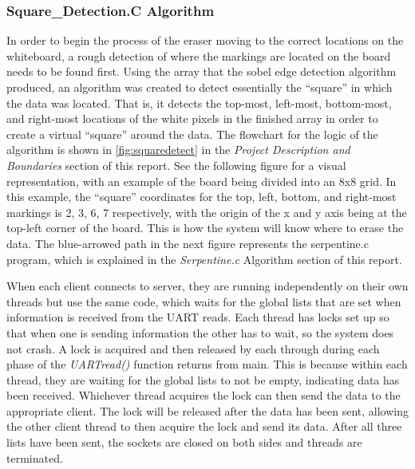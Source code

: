 \subsubsection{Square\_Detection.C Algorithm}
In order to begin the process of the eraser moving to the correct locations on the whiteboard, a rough detection of where the markings are located on the board needs to be found first. Using the array that the sobel edge detection algorithm produced, an algorithm was created to detect essentially the ``square'' in which the data was located. That is, it detects the top-most, left-most, bottom-most, and right-most locations of the white pixels in the finished array in order to create a virtual ``square'' around the data. The flowchart for the logic of the algorithm is shown in \ref{fig:squaredetect} in the \textit{Project Description and Boundaries} section of this report. See the following figure for a visual representation, with an example of the board being divided into an 8x8 grid. In this example, the ``square'' coordinates for the top, left, bottom, and right-most markings is 2, 3, 6, 7 respectively, with the origin of the x and y axis being at the top-left corner of the board. This is how the system will know where to erase the data. The blue-arrowed path in the next figure represents the serpentine.c program, which is explained in the \textit{Serpentine.c} Algorithm section of this report.\par
\setlength{\parindent}{2.5ex}
When each client connects to server, they are running independently on their own threads but use the same code, which waits for the global lists that are set when information is received from the UART reads. Each thread has locks set up so that when one is sending information the other has to wait, so the system does not crash. A lock is acquired and then released by each through during each phase of the \textit{UARTread()} function returns from main. This is because within each thread, they are waiting for the global lists to not be empty, indicating data has been received. Whichever thread acquires the lock can then send the data to the appropriate client. The lock will be released after the data has been sent, allowing the other client thread to then acquire the lock and send its data. After all three lists have been sent, the sockets are closed on both sides and threads are terminated.

